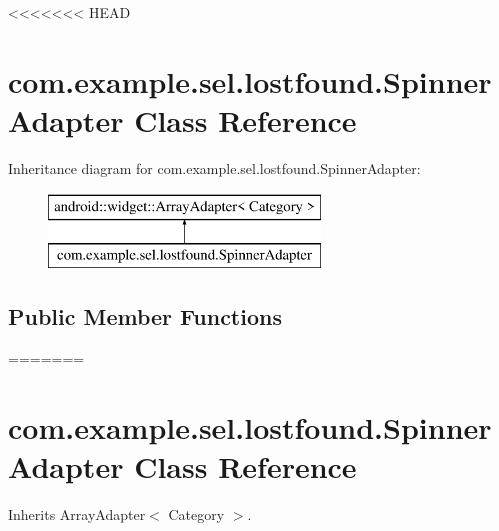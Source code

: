 <<<<<<< HEAD
\hypertarget{classcom_1_1example_1_1sel_1_1lostfound_1_1SpinnerAdapter}{\section{com.\-example.\-sel.\-lostfound.\-Spinner\-Adapter Class Reference}
\label{classcom_1_1example_1_1sel_1_1lostfound_1_1SpinnerAdapter}
}
Inheritance diagram for com.\-example.\-sel.\-lostfound.\-Spinner\-Adapter\-:\begin{figure}[H]
\begin{center}
\leavevmode
\includegraphics[height=2.000000cm]{classcom_1_1example_1_1sel_1_1lostfound_1_1SpinnerAdapter}
\end{center}
\end{figure}
\subsection*{Public Member Functions}
=======
\hypertarget{classcom_1_1example_1_1sel_1_1lostfound_1_1SpinnerAdapter}{\section{com.\-example.\-sel.\-lostfound.\-Spinner\-Adapter \-Class \-Reference}
\label{classcom_1_1example_1_1sel_1_1lostfound_1_1SpinnerAdapter}
}


\-Inherits \-Array\-Adapter$<$ Category $>$.

